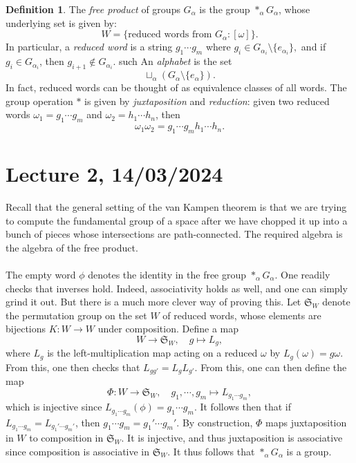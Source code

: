 \documentclass[a4paper]{report}
\theoremstyle{definition}
\newtheorem{definition}{Definition}
\theoremstyle{remark}
\theoremstyle{proposition}
\theoremstyle{conjecture}
\theoremstyle{lemma}
\theoremstyle{corollary}
\theoremstyle{exercise}
\begin{document}
\begin{definition}
    The \emph{free product} of groups $G_\alpha$ is the group 
    $\ast_\alpha G_\alpha$, whose underlying set is given by:
    $$W  = \lbrace \text{reduced words from $G_\alpha$} : [\omega]\rbrace.$$
    In particular, a \emph{reduced word} is a string 
    $g_1\cdots g_m$ where 
    $g_i \in G_{\alpha_i}\setminus \lbrace e_{\alpha_i}\rbrace,$
    and if $g_i \in G_{\alpha_i}$, then $g_{i+1}\not\in G_{\alpha_i}$.
    such 
    An \emph{alphabet} is the set 
    $$\sqcup_\alpha (G_\alpha \setminus \lbrace e_\alpha\rbrace).$$
    In fact, reduced words can be thought of as equivalence classes of all words.
    The group operation $\ast$ is given by \emph{juxtaposition} and 
    \emph{reduction}: given two reduced words $\omega_1 = g_1\cdots g_m$ and 
    $\omega_2 = h_1\cdots h_n$, then 
    $$\omega_1 \omega_2 = g_1\cdots g_m h_1\cdots h_n.$$
\end{definition}

\section{Lecture 2, 14/03/2024}

Recall that the general setting of the van Kampen theorem is that we 
are trying to compute the fundamental group of a space after we have 
chopped it up into a bunch of pieces whose intersections are path-connected.
The required algebra is the algebra of the free product.\\\\
The empty word $\phi$ denotes the identity in the free group 
$\ast_\alpha G_\alpha$. One readily checks that inverses hold.
Indeed, associativity holds as well, and one can simply grind it out. 
But there is a much more clever way of proving this.
Let $\mathfrak{S}_W$ denote the permutation group on the set $W$ of reduced 
words, whose elements are bijections $K : W \to W$ under composition. Define
a map $$W \longrightarrow \mathfrak{S}_W,\quad g \longmapsto L_g,$$
where $L_g$ is the left-multiplication map acting on a reduced $\omega$ by
$L_g(\omega) = g\omega$. From this, one then checks that
$L_{gg'} = L_g L_{g'}$. From this, one can then define the map
$$\Phi : W\longrightarrow \mathfrak{S}_W, \quad g_1,\cdots,g_m \longmapsto L_{g_1\cdots g_m},$$
which is injective since $L_{g_1\cdots g_m}(\phi) = g_1\cdots g_m$.
It follows then that if $L_{g_1\cdots g_m} = L_{g_1'\cdots g_m'}$,
then $g_1\cdots g_m = g_1'\cdots g_m'$.
By construction, $\Phi$ maps juxtaposition in $W$ to composition in 
$\mathfrak{S}_W$. It is injective, and thus juxtaposition is associative
since composition is associative in $\mathfrak{S}_W$.
It thus follows that $\ast_\alpha G_\alpha$ is a group.
\end{document}
